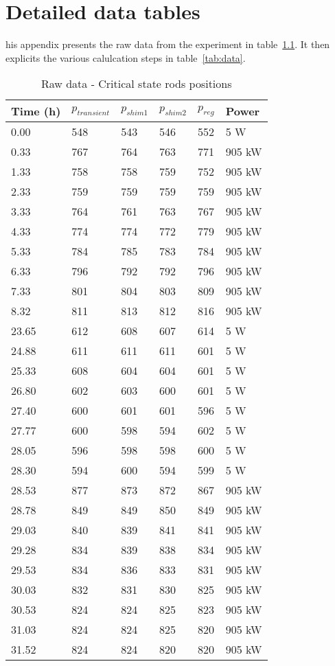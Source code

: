 \chapter{Detailed data tables}
\label{app:app01}

his appendix presents the raw data from the experiment in table~\ref{tab:time_rawdata}. It then explicits the various calulcation steps in table~\ref{tab:data}.

\begin{table}[!htb]
    \centering
\begin{tabular}{llllll}
Time (h) & $p_{transient}$ & $p_{shim1}$ & $p_{shim2}$ & $p_{reg}$ & Power \\ \hline\hline
0.00  & 548 & 543 & 546 & 552 & 5 W    \\
0.33  & 767 & 764 & 763 & 771 & 905 kW \\
1.33  & 758 & 758 & 759 & 752 & 905 kW \\
2.33  & 759 & 759 & 759 & 759 & 905 kW \\
3.33  & 764 & 761 & 763 & 767 & 905 kW \\
4.33  & 774 & 774 & 772 & 779 & 905 kW \\
5.33  & 784 & 785 & 783 & 784 & 905 kW \\
6.33  & 796 & 792 & 792 & 796 & 905 kW \\
7.33  & 801 & 804 & 803 & 809 & 905 kW \\
8.32  & 811 & 813 & 812 & 816 & 905 kW \\
23.65 & 612 & 608 & 607 & 614 & 5 W    \\
24.88 & 611 & 611 & 611 & 601 & 5 W    \\
25.33 & 608 & 604 & 604 & 601 & 5 W    \\
26.80 & 602 & 603 & 600 & 601 & 5 W    \\
27.40 & 600 & 601 & 601 & 596 & 5 W    \\
27.77 & 600 & 598 & 594 & 602 & 5 W    \\
28.05 & 596 & 598 & 598 & 600 & 5 W    \\
28.30 & 594 & 600 & 594 & 599 & 5 W    \\
28.53 & 877 & 873 & 872 & 867 & 905 kW \\
28.78 & 849 & 849 & 850 & 849 & 905 kW \\
29.03 & 840 & 839 & 841 & 841 & 905 kW \\
29.28 & 834 & 839 & 838 & 834 & 905 kW \\
29.53 & 834 & 836 & 833 & 831 & 905 kW \\
30.03 & 832 & 831 & 830 & 825 & 905 kW \\
30.53 & 824 & 824 & 825 & 823 & 905 kW \\
31.03 & 824 & 824 & 825 & 820 & 905 kW \\
31.52 & 824 & 824 & 820 & 820 & 905 kW
\end{tabular}
        \caption{Raw data - Critical state rods positions}\label{tab:time_rawdata}
\end{table}


